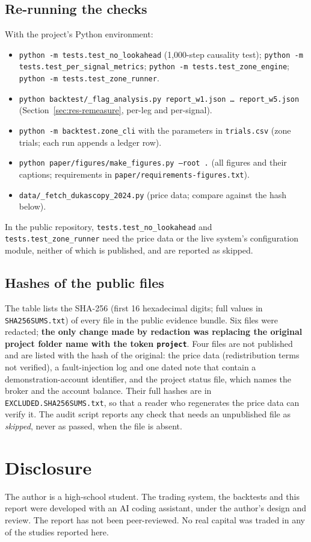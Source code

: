 \documentclass[11pt,a4paper]{article}
\begin{document}
\subsection{Re-running the checks}
With the project's Python environment:
\begin{itemize}[before=\raggedright]
\item \texttt{python -m tests.test\_no\_lookahead} (1,000-step causality test);
\texttt{python -m tests.test\_per\_signal\_metrics}; \texttt{python -m tests.test\_zone\_engine};
\texttt{python -m tests.test\_zone\_runner}.
\item \texttt{python backtest/\_flag\_analysis.py report\_w1.json \ldots{} report\_w5.json}
(Section~\ref{sec:res-remeasure}, per-leg and per-signal).
\item \texttt{python -m backtest.zone\_cli} with the parameters in \texttt{trials.csv} (zone
trials; each run appends a ledger row).
\item \texttt{python paper/figures/make\_figures.py --root .} (all figures and their captions;
requirements in \texttt{paper/requirements-figures.txt}).
\item \texttt{data/\_fetch\_dukascopy\_2024.py} (price data; compare against the hash below).
\end{itemize}
In the public repository, \texttt{tests.test\_no\_lookahead} and \texttt{tests.test\_zone\_runner}
need the price data or the live system's configuration module, neither of which is published, and
are reported as skipped.

\subsection{Hashes of the public files}
The table lists the SHA-256 (first 16 hexadecimal digits; full values in
\texttt{SHA256SUMS.txt}) of every file in the public evidence bundle. Six files were redacted;
\textbf{the only change made by redaction was replacing the original project folder name with the
token \texttt{project}}. Four files are not published and are listed with the hash of the
original: the price data (redistribution terms not verified), a fault-injection log and one
dated note that contain a demonstration-account identifier, and the project status file, which
names the broker and the account balance. Their full hashes are in
\texttt{EXCLUDED.SHA256SUMS.txt}, so that a reader who regenerates the price data can verify it.
The audit script reports any check that needs an unpublished file as \emph{skipped}, never as
passed, when the file is absent.



\section{Disclosure}
\label{app:disclosure}
The author is a high-school student. The trading system, the backtests and this report were
developed with an AI coding assistant, under the author's design and review. The report has not
been peer-reviewed. No real capital was traded in any of the studies reported here.
\end{document}
